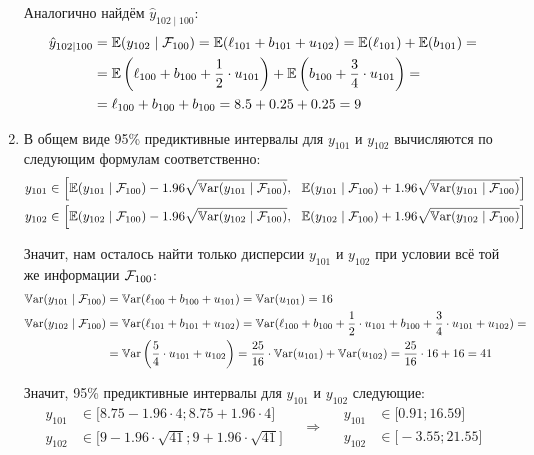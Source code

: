 \begin{problem}
\begin{sol}
\begin{enumerate}
  Аналогично найдём $\hat{y}_{102 \mid 100}$:
  \begin{align*}
      \hat{y}_{102 \mid 100} &= \operatorname{\mathbb{E}}(y_{102} \mid \mathcal{F}_{100}) = \operatorname{\mathbb{E}}(\ell_{101} + b_{101} + u_{102}) = \operatorname{\mathbb{E}}(\ell_{101}) + \operatorname{\mathbb{E}}(b_{101}) = \\ 
      &= \operatorname{\mathbb{E}}\left(\ell_{100} + b_{100} + \frac{1}{2} \cdot u_{101}\right) + \operatorname{\mathbb{E}}\left(b_{100} + \frac{3}{4} \cdot u_{101}\right) = \\
      &= \ell_{100} + b_{100} + b_{100} = 8.5 + 0.25 + 0.25 = 9
  \end{align*}
  
  \item В общем виде 95\% предиктивные интервалы для $y_{101}$ и $y_{102}$ вычисляются по следующим формулам соответственно:
  \begin{gather*}
      y_{101} \in \left[\operatorname{\mathbb{E}}(y_{101} \mid \mathcal{F}_{100}) - 1.96 \sqrt{\operatorname{\mathbb{V}\mathrm{ar}}(y_{101} \mid \mathcal{F}_{100})},\ \  \operatorname{\mathbb{E}}(y_{101} \mid \mathcal{F}_{100}) + 1.96 \sqrt{\operatorname{\mathbb{V}\mathrm{ar}}(y_{101} \mid \mathcal{F}_{100})}\right] \\
      y_{102} \in \left[\operatorname{\mathbb{E}}(y_{102} \mid \mathcal{F}_{100}) - 1.96 \sqrt{\operatorname{\mathbb{V}\mathrm{ar}}(y_{102} \mid \mathcal{F}_{100})},\ \  \operatorname{\mathbb{E}}(y_{102} \mid \mathcal{F}_{100}) + 1.96 \sqrt{\operatorname{\mathbb{V}\mathrm{ar}}(y_{102} \mid \mathcal{F}_{100})}\right]
  \end{gather*}
  
  Значит, нам осталось найти только дисперсии $y_{101}$ и $y_{102}$ при условии всё той же информации $\mathcal{F}_{100}$:
  \begin{align*}
      \operatorname{\mathbb{V}\mathrm{ar}}(y_{101} \mid \mathcal{F}_{100}) &= \operatorname{\mathbb{V}\mathrm{ar}}(\ell_{100} + b_{100} + u_{101}) = \operatorname{\mathbb{V}\mathrm{ar}}(u_{101}) = 16 \\
      \operatorname{\mathbb{V}\mathrm{ar}}(y_{102} \mid \mathcal{F}_{100}) &= \operatorname{\mathbb{V}\mathrm{ar}}(\ell_{101} + b_{101} + u_{102}) = \operatorname{\mathbb{V}\mathrm{ar}}(\ell_{100} + b_{100} + \frac{1}{2} \cdot u_{101} + b_{100} + \frac{3}{4} \cdot u_{101} + u_{102}) = \\
      &= \operatorname{\mathbb{V}\mathrm{ar}}\left(\frac{5}{4} \cdot u_{101} + u_{102}\right) = \frac{25}{16} \cdot \operatorname{\mathbb{V}\mathrm{ar}}(u_{101}) + \operatorname{\mathbb{V}\mathrm{ar}}(u_{102}) = \frac{25}{16} \cdot 16 + 16 = 41
  \end{align*}
  
  Значит, 95\% предиктивные интервалы для $y_{101}$ и $y_{102}$ следующие:
  \[
  \begin{aligned}
      y_{101} &\in \big[8.75 - 1.96 \cdot 4; 8.75 + 1.96 \cdot 4\big] \\
      y_{102} &\in \big[9 - 1.96 \cdot \sqrt{41}; 9 + 1.96 \cdot \sqrt{41}\big]
  \end{aligned}
  \quad \Rightarrow \quad
  \begin{aligned}
      y_{101} &\in \big[0.91; 16.59\big] \\
      y_{102} &\in \big[-3.55; 21.55\big]
  \end{aligned}
  \]
\end{enumerate}
\end{sol}
\end{problem}


